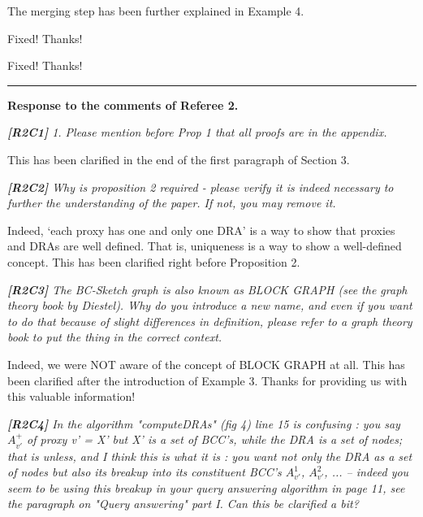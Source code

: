 \documentclass[11pt]{letter}
\newcommand{\vs}{\vspace{1ex}}
\newcommand{\svs}{\vspace{0.36ex}}
\begin{document}
The merging step has been further explained in Example 4.

\svs

Fixed! Thanks!

\svs


Fixed! Thanks!



\vspace{2.8ex}
\hrule
\vspace{0.6ex}
{\bf Response to the comments of Referee 2.}



\vs
\noindent
{\em
{\bf [R2C1]}
1. Please mention before Prop 1 that all proofs are in the appendix.}
\svs

This has been clarified in the end of the first paragraph of Section 3.

\vs
\noindent
{\em
{\bf [R2C2]} Why is proposition 2 required - please verify it is indeed necessary to further the understanding of the paper. If not, you may remove it.}
\svs

Indeed, `each proxy has one and only one DRA' is a way to show that proxies and DRAs are well defined. That is, uniqueness is a way to show a well-defined concept. This has been clarified right before Proposition 2.

\vs
\noindent
{\em
{\bf [R2C3]} The BC-Sketch graph is also known as BLOCK GRAPH (see the graph theory book by Diestel). Why do you introduce a new name, and even if you want to do that because of slight differences in definition, please refer to a graph theory book to put the thing in the correct context.}
\svs

Indeed, we were NOT aware of the concept of BLOCK GRAPH at all. This has been clarified after the introduction of Example 3. Thanks for providing us with this valuable information!


\vs
\noindent
{\em{\bf[R2C4]}  In the algorithm "computeDRAs" (fig 4) line 15 is confusing : you say $A^+_{v'}$ of proxy v' = X' but X' is a set of BCC's, while the DRA is a set of nodes; that is unless, and I think this is what it is : you want not only the DRA as a set of nodes but also its breakup into its constituent BCC's $A^1_{v'}$, $A^2_{v'}$, ... -- indeed you seem to be using this breakup in your query answering algorithm in page 11, see the paragraph on "Query answering" part I. Can this be clarified a bit?}
\svs
\end{document}
